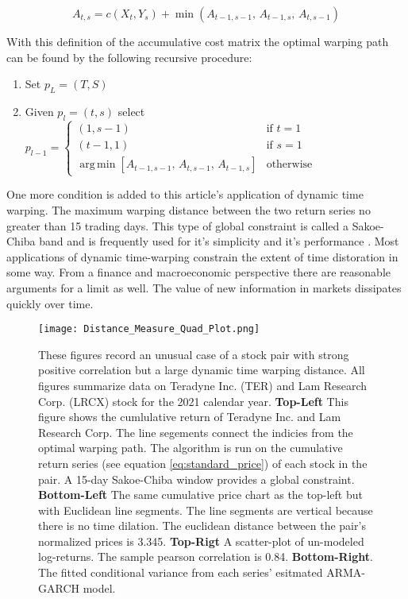\documentclass[12pt]{article}
\DeclareMathOperator*{\argmin}{arg\,min}
\begin{document}
\begin{equation} \label{eq:dtw_recursive_calculation}
    A_{t, s} = c(X_{t}, Y_{s}) + \min\left(A_{t-1, s-1}, \, A_{t-1, s}, \, A_{t, s-1}\right)
\end{equation}

With this definition of the accumulative cost matrix the optimal warping path can be found by the following recursive procedure:

\begin{enumerate}
    \item Set $p_{L} = (T, S)$
    \item Given $p_{l} = (t, s)$ select $p_{l - 1} = \begin{cases} (1, s-1) & \textrm{if } t=1 \\ (t-1,1) & \textrm{if } s=1 \\ 
                                            \argmin \left[ A_{t-1, s-1},\, A_{t, s-1},\, A_{t-1, s} \right] & \textrm{otherwise} \end{cases}$
\end{enumerate}

One more condition is added to this article's application of dynamic time warping. The maximum warping distance between the two return series no greater than 15 trading days. This type of global constraint is called a Sakoe-Chiba band \parencite{SakoeChiba_IEEE_1978} and is frequently used for it's simplicity and it's performance \parencite{geler2019dynamic}. Most applications of dynamic time-warping constrain the extent of time distoration in some way. From a finance and macroeconomic perspective there are reasonable arguments for a limit as well. The value of new information in markets dissipates quickly over time.

\begin{figure}
    \centering
    \texttt{[image: Distance\_Measure\_Quad\_Plot.png]}
    \caption{These figures record an unusual case of a stock pair with strong positive correlation but a large dynamic time warping distance. All figures summarize data on Teradyne Inc. (TER) and Lam Research Corp. (LRCX) stock for the 2021 calendar year. \textbf{Top-Left} This figure shows the cumlulative return of Teradyne Inc. and Lam Research Corp. The line segements connect the indicies from the optimal warping path. The algorithm is run on the cumulative return series (see equation \ref{eq:standard_price}) of each stock in the pair. A 15-day Sakoe-Chiba window provides a global constraint. \textbf{Bottom-Left} The same cumulative price chart as the top-left but with Euclidean line segments. The line segments are vertical because there is no time dilation. The euclidean distance between the pair's normalized prices is 3.345. \textbf{Top-Rigt} A scatter-plot of un-modeled log-returns. The sample pearson correlation is 0.84. \textbf{Bottom-Right}. The fitted conditional variance from each series' esitmated ARMA-GARCH model.}
    \label{fig:dtw_plot_stock_price_index_matching}
\end{figure}
\end{document}
